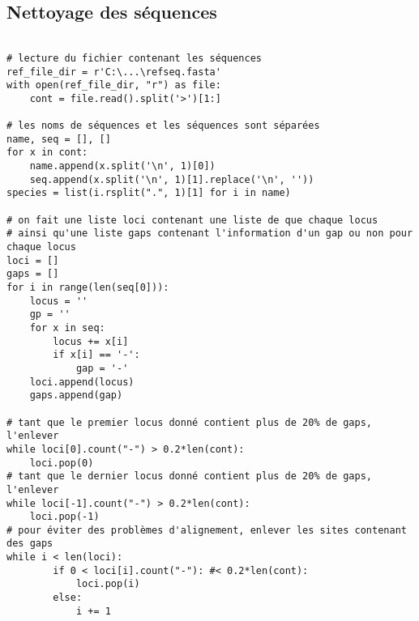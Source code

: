 
\subsection{Nettoyage des séquences}
\label{ann:annexeD1}
    \begin{tcolorbox}[colback=darkgray!5!white,colframe=black!75!black]
        \begin{verbatim}

# lecture du fichier contenant les séquences
ref_file_dir = r'C:\...\refseq.fasta'
with open(ref_file_dir, "r") as file:
    cont = file.read().split('>')[1:]

# les noms de séquences et les séquences sont séparées
name, seq = [], []
for x in cont:
    name.append(x.split('\n', 1)[0])
    seq.append(x.split('\n', 1)[1].replace('\n', ''))
species = list(i.rsplit(".", 1)[1] for i in name)

# on fait une liste loci contenant une liste de que chaque locus
# ainsi qu'une liste gaps contenant l'information d'un gap ou non pour chaque locus
loci = []
gaps = []
for i in range(len(seq[0])):
    locus = ''
    gp = ''
    for x in seq:
        locus += x[i]
        if x[i] == '-':
            gap = '-'
    loci.append(locus)
    gaps.append(gap)

# tant que le premier locus donné contient plus de 20% de gaps, l'enlever
while loci[0].count("-") > 0.2*len(cont):
    loci.pop(0)
# tant que le dernier locus donné contient plus de 20% de gaps, l'enlever
while loci[-1].count("-") > 0.2*len(cont):
    loci.pop(-1)
# pour éviter des problèmes d'alignement, enlever les sites contenant des gaps
while i < len(loci):
        if 0 < loci[i].count("-"): #< 0.2*len(cont):
            loci.pop(i)
        else:
            i += 1

        \end{verbatim}
    \end{tcolorbox}
